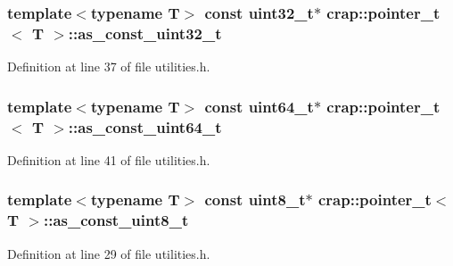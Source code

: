 \hypertarget{structcrap_1_1pointer__t_a93e98760d5f987b6eefc1b96a5b7d00d}{}
\subsubsection[{as\+\_\+const\+\_\+uint32\+\_\+t}]{\setlength{\rightskip}{0pt plus 5cm}template$<$typename T$>$ const uint32\+\_\+t$\ast$ {\bf crap\+::pointer\+\_\+t}$<$ T $>$\+::as\+\_\+const\+\_\+uint32\+\_\+t}\label{structcrap_1_1pointer__t_a93e98760d5f987b6eefc1b96a5b7d00d}


Definition at line 37 of file utilities.\+h.

\hypertarget{structcrap_1_1pointer__t_a72c063a43850807a483d3d91f08b6ebd}{}
\subsubsection[{as\+\_\+const\+\_\+uint64\+\_\+t}]{\setlength{\rightskip}{0pt plus 5cm}template$<$typename T$>$ const uint64\+\_\+t$\ast$ {\bf crap\+::pointer\+\_\+t}$<$ T $>$\+::as\+\_\+const\+\_\+uint64\+\_\+t}\label{structcrap_1_1pointer__t_a72c063a43850807a483d3d91f08b6ebd}


Definition at line 41 of file utilities.\+h.

\hypertarget{structcrap_1_1pointer__t_a9501aed2048dbef966d66362b39bc3fe}{}
\subsubsection[{as\+\_\+const\+\_\+uint8\+\_\+t}]{\setlength{\rightskip}{0pt plus 5cm}template$<$typename T$>$ const uint8\+\_\+t$\ast$ {\bf crap\+::pointer\+\_\+t}$<$ T $>$\+::as\+\_\+const\+\_\+uint8\+\_\+t}\label{structcrap_1_1pointer__t_a9501aed2048dbef966d66362b39bc3fe}


Definition at line 29 of file utilities.\+h.

